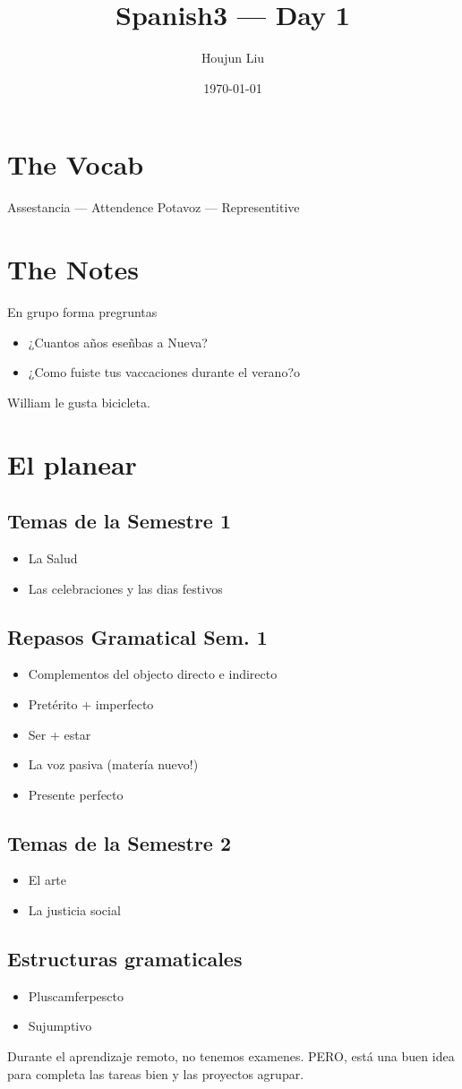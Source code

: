 \documentclass[letterpaper]{article}
\author{Houjun Liu}
\date{\today}
\title{Spanish3 --- Day 1}
\renewcommand{\tableofcontents}{}
\begin{document}
\tableofcontents



\section{The Vocab}
\label{sec:org499e7ed}
Assestancia --- Attendence Potavoz --- Representitive

\section{The Notes}
\label{sec:org33747f3}
En grupo forma pregruntas

\begin{itemize}
\item ¿Cuantos años eseñbas a Nueva?
\item ¿Como fuiste tus vaccaciones durante el verano?o
\end{itemize}

William le gusta bicicleta.

\section{El planear}
\label{sec:orgb6adaff}
\subsection{Temas de la Semestre 1}
\label{sec:org0dc3c54}
\begin{itemize}
\item La Salud
\item Las celebraciones y las dias festivos
\end{itemize}

\subsection{Repasos Gramatical Sem. 1}
\label{sec:org57165fd}
\begin{itemize}
\item Complementos del objecto directo e indirecto
\item Pretérito + imperfecto
\item Ser + estar
\item La voz pasiva (matería nuevo!)
\item Presente perfecto
\end{itemize}

\subsection{Temas de la Semestre 2}
\label{sec:orgb5945e6}
\begin{itemize}
\item El arte
\item La justicia social
\end{itemize}

\subsection{Estructuras gramaticales}
\label{sec:org8b9e19d}
\begin{itemize}
\item Pluscamferpescto
\item Sujumptivo
\end{itemize}

Durante el aprendizaje remoto, no tenemos examenes. PERO, está una buen
idea para completa las tareas bien y las proyectos agrupar.
\end{document}
